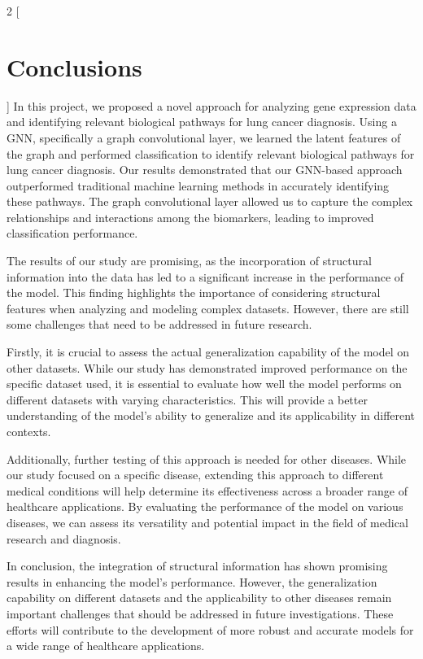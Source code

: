\documentclass{article}
\begin{document}
\begin{multicols}{2}
[
\section{Conclusions} \label{sec:4}
]
In this project, we proposed a novel approach for analyzing gene expression data and identifying relevant biological pathways for lung cancer diagnosis. Using a GNN, specifically a graph convolutional layer, we learned the latent features of the graph and performed classification to identify relevant biological pathways for lung cancer diagnosis. Our results demonstrated that our GNN-based approach outperformed traditional machine learning methods in accurately identifying these pathways. The graph convolutional layer allowed us to capture the complex relationships and interactions among the biomarkers, leading to improved classification performance.

The results of our study are promising, as the incorporation of structural information into the data has led to a significant increase in the performance of the model. This finding highlights the importance of considering structural features when analyzing and modeling complex datasets. However, there are still some challenges that need to be addressed in future research.

Firstly, it is crucial to assess the actual generalization capability of the model on other datasets. While our study has demonstrated improved performance on the specific dataset used, it is essential to evaluate how well the model performs on different datasets with varying characteristics. This will provide a better understanding of the model's ability to generalize and its applicability in different contexts.

Additionally, further testing of this approach is needed for other diseases. While our study focused on a specific disease, extending this approach to different medical conditions will help determine its effectiveness across a broader range of healthcare applications. By evaluating the performance of the model on various diseases, we can assess its versatility and potential impact in the field of medical research and diagnosis.

In conclusion, the integration of structural information has shown promising results in enhancing the model's performance. However, the generalization capability on different datasets and the applicability to other diseases remain important challenges that should be addressed in future investigations. These efforts will contribute to the development of more robust and accurate models for a wide range of healthcare applications.

\end{multicols}
\newpage
\printbibliography[heading=bibintoc]
\end{document}
